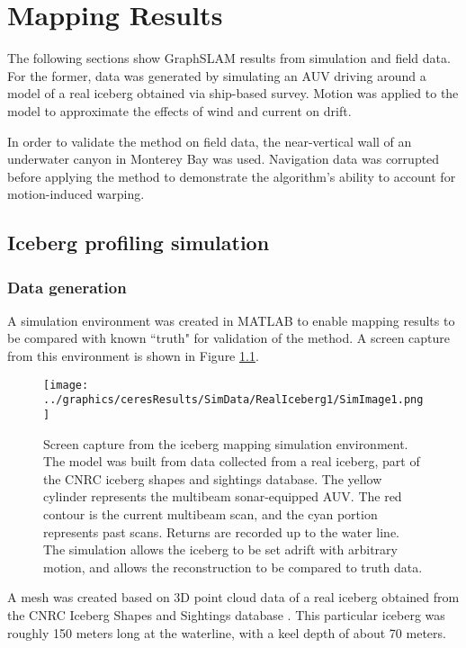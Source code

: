 
\chapter{Mapping Results}
\label{ch.Results}

The following sections show GraphSLAM results from simulation and field data. For the former, data was generated by simulating an AUV driving around a model of a real iceberg obtained via ship-based survey. Motion was applied to the model to approximate the effects of wind and current on drift.

In order to validate the method on field data, the near-vertical wall of an underwater canyon in Monterey Bay was used. Navigation data was corrupted before applying the method to demonstrate the algorithm's ability to account for motion-induced warping.

\section{Iceberg profiling simulation}

\subsection{Data generation}

A simulation environment was created in MATLAB to enable mapping results to be compared with known ``truth" for validation of the method. A screen capture from this environment is shown in Figure \ref{fig:IcebergSim}.
 
 \begin{figure}[!htb]
   \centering
   \texttt{[image: ../graphics/ceresResults/SimData/RealIceberg1/SimImage1.png]} %
   \caption{Screen capture from the iceberg mapping simulation environment. The model was built from data collected from a real iceberg, part of the CNRC iceberg shapes and sightings database. The yellow cylinder represents the multibeam sonar-equipped AUV. The red contour is the current multibeam scan, and the cyan portion represents past scans. Returns are recorded up to the water line. The simulation allows the iceberg to be set adrift with arbitrary motion, and allows the reconstruction to be compared to truth data.}
   \label{fig:IcebergSim}
\end{figure}

A mesh was created based on 3D point cloud data of a real iceberg obtained from the CNRC Iceberg Shapes and Sightings database \cite{Verbit2006}. This particular iceberg was roughly 150 meters long at the waterline, with a keel depth of about 70 meters.

